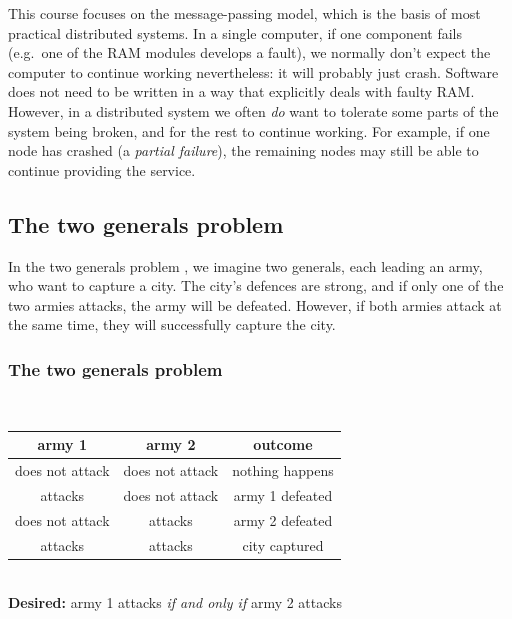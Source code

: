 This course focuses on the message-passing model, which is the basis of most practical distributed systems.
In a single computer, if one component fails (e.g.\ one of the RAM modules develops a fault), we normally don't expect the computer to continue working nevertheless: it will probably just crash.
Software does not need to be written in a way that explicitly deals with faulty RAM.
However, in a distributed system we often \emph{do} want to tolerate some parts of the system being broken, and for the rest to continue working.
For example, if one node has crashed (a \emph{partial failure}), the remaining nodes may still be able to continue providing the service.

\subsection{The two generals problem}\label{sec:two-generals}

In the two generals problem \citep{Gray:1978}, we imagine two generals, each leading an army, who want to capture a city.
The city's defences are strong, and if only one of the two armies attacks, the army will be defeated.
However, if both armies attack at the same time, they will successfully capture the city.

\begin{frame}
    \label{s:two-generals}
    \frametitle{The two generals problem}
    \begin{center}
        \\[1em]\pause
        \renewcommand{\arraystretch}{1.3}
        \begin{tabular}{c|c|c}
            \hline
            \textbf{army 1} & \textbf{army 2} & \textbf{outcome} \\\hline
            does not attack & does not attack & nothing happens \\
            attacks & does not attack & army 1 defeated \\
            does not attack & attacks & army 2 defeated \\
            attacks & attacks & city captured \\\hline
        \end{tabular}\\[1em]
        \textbf{Desired:} army 1 attacks \emph{if and only if} army 2 attacks
    \end{center}
\end{frame}
\label{l:two-generals}

